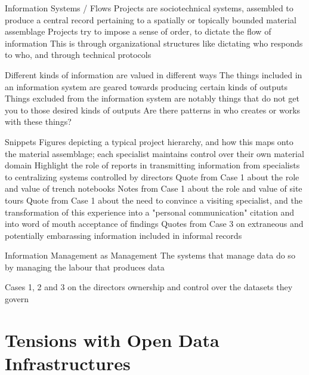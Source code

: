 \documentclass{beamer}
\begin{document}
\begin{frame}{Information Systems / Flows}
  Projects are sociotechnical systems, assembled to produce a central record pertaining to a spatially or topically bounded material assemblage
  Projects try to impose a sense of order, to dictate the flow of information
  This is through organizational structures like dictating who responds to who, and through technical protocols

  Different kinds of information are valued in different ways
  The things included in an information system are geared towards producing certain kinds of outputs
  Things excluded from the information system are notably things that do not get you to those desired kinds of outputs
  Are there patterns in who creates or works with these things?
  
\end{frame}

\begin{frame}{Snippets}
  Figures depicting a typical project hierarchy, and how this maps onto the material assemblage; each specialist maintains control over their own material domain
  Highlight the role of reports in transmitting information from specialists to centralizing systems controlled by directors
  Quote from Case 1 about the role and value of trench notebooks
  Notes from Case 1 about the role and value of site tours
  Quote from Case 1 about the need to convince a visiting specialist, and the transformation of this experience into a "personal communication" citation and into word of mouth acceptance of findings
  Quotes from Case 3 on extraneous and potentially embarassing information included in informal records
  

\end{frame}


\begin{frame}{Information Management as Management}
  The systems that manage data do so by managing the labour that produces data

\end{frame}

\begin{frame}
  Cases 1, 2 and 3 on the directors ownership and control over the datasets they govern

\end{frame}

\section{Tensions with Open Data Infrastructures}
\end{document}
